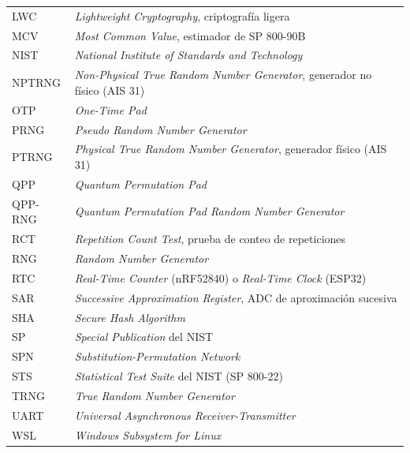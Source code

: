 {\begin{longtable}{@{}p{3.0cm}p{11.0cm}@{}}
LWC & \textit{Lightweight Cryptography}, criptografía ligera\\[0.6ex]
MCV & \textit{Most Common Value}, estimador de SP 800-90B\\[0.6ex]
NIST & \textit{National Institute of Standards and Technology}\\[0.6ex]
NPTRNG & \textit{Non-Physical True Random Number Generator}, generador no físico (AIS 31)\\[0.6ex]
OTP & \textit{One-Time Pad}\\[0.6ex]
PRNG & \textit{Pseudo Random Number Generator}\\[0.6ex]
PTRNG & \textit{Physical True Random Number Generator}, generador físico (AIS 31)\\[0.6ex]
QPP & \textit{Quantum Permutation Pad}\\[0.6ex]
QPP-RNG & \textit{Quantum Permutation Pad Random Number Generator}\\[0.6ex]
RCT & \textit{Repetition Count Test}, prueba de conteo de repeticiones\\[0.6ex]
RNG & \textit{Random Number Generator}\\[0.6ex]
RTC & \textit{Real-Time Counter} (nRF52840) o \textit{Real-Time Clock} (ESP32)\\[0.6ex]
SAR & \textit{Successive Approximation Register}, ADC de aproximación sucesiva\\[0.6ex]
SHA & \textit{Secure Hash Algorithm}\\[0.6ex]
SP & \textit{Special Publication} del NIST\\[0.6ex]
SPN & \textit{Substitution-Permutation Network}\\[0.6ex]
STS & \textit{Statistical Test Suite} del NIST (SP 800-22)\\[0.6ex]
TRNG & \textit{True Random Number Generator}\\[0.6ex]
UART & \textit{Universal Asynchronous Receiver-Transmitter}\\[0.6ex]
WSL & \textit{Windows Subsystem for Linux}\\
\end{longtable}}